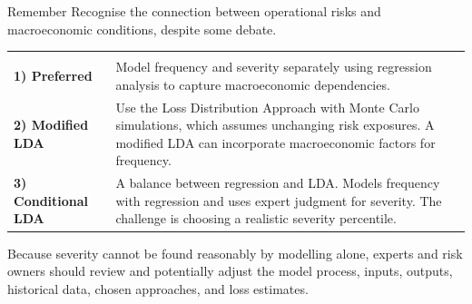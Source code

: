 \begin{ornotebox}{Remember}
Recognise the connection between operational risks and macroeconomic conditions,
despite some debate.
\end{ornotebox}


\noindent\begin{minipage}{\textwidth}
\renewcommand{\arraystretch}{1.35}
\begin{tabularx}{\textwidth}{@{}L{0.20\textwidth}Y@{}}
  & \\
{\tabfont \textbf{1) Preferred}} &
{\tabfont Model frequency and severity separately using regression analysis to
capture macroeconomic dependencies.}\\
{\tabfont \textbf{2) Modified LDA}} &
{\tabfont Use the Loss Distribution Approach with Monte Carlo simulations, which
assumes unchanging risk exposures. A modified LDA can incorporate macroeconomic
factors for frequency.}\\
{\tabfont \textbf{3) Conditional LDA}} &
{\tabfont A balance between regression and LDA. Models frequency with regression
and uses expert judgment for severity. The challenge is choosing a realistic
severity percentile.}\\
\end{tabularx}
\end{minipage}


Because severity cannot be found reasonably by modelling alone, experts and risk
owners should review and potentially adjust the model process, inputs, outputs,
historical data, chosen approaches, and loss estimates.
